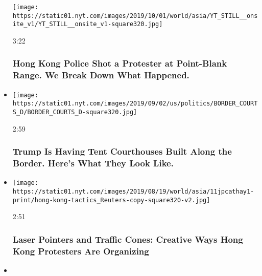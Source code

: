 \begin{itemize}
  \texttt{[image: https://static01.nyt.com/images/2019/10/01/world/asia/YT\_STILL\_\_onsite\_v1/YT\_STILL\_\_onsite\_v1-square320.jpg]}

  3:22

  \hypertarget{hong-kong-police-shot-a-protester-at-point-blank-range-we-break-down-what-happened}{%
  \subsubsection{Hong Kong Police Shot a Protester at Point-Blank Range.
  We Break Down What
  Happened.}\label{hong-kong-police-shot-a-protester-at-point-blank-range-we-break-down-what-happened}}
\item
  \href{https://www.nytimes.com/video/us/politics/100000006681200/border-immigration-tent-courthouses.html?action=click\&module=video-series-bar\&region=header\&pgtype=Article\&playlistId=video/investigations}{}

  \texttt{[image: https://static01.nyt.com/images/2019/09/02/us/politics/BORDER\_COURTS\_D/BORDER\_COURTS\_D-square320.jpg]}

  2:59

  \hypertarget{trump-is-having-tent-courthouses-built-along-the-border-heres-what-they-look-like}{%
  \subsubsection{Trump Is Having Tent Courthouses Built Along the
  Border. Here's What They Look
  Like.}\label{trump-is-having-tent-courthouses-built-along-the-border-heres-what-they-look-like}}
\item
  \href{https://www.nytimes.com/video/world/asia/100000006649109/laser-pointers-and-traffic-cones-creative-ways-hong-kong-protesters-are-organizing.html?action=click\&module=video-series-bar\&region=header\&pgtype=Article\&playlistId=video/investigations}{}

  \texttt{[image: https://static01.nyt.com/images/2019/08/19/world/asia/11jpcathay1-print/hong-kong-tactics\_Reuters-copy-square320-v2.jpg]}

  2:51

  \hypertarget{laser-pointers-and-traffic-cones-creative-ways-hong-kong-protesters-are-organizing}{%
  \subsubsection{Laser Pointers and Traffic Cones: Creative Ways Hong
  Kong Protesters Are
  Organizing}\label{laser-pointers-and-traffic-cones-creative-ways-hong-kong-protesters-are-organizing}}
\item
  \href{https://www.nytimes.com/video/world/asia/100000006624535/hong-kong-protest-police-triad-investigation.html?action=click\&module=video-series-bar\&region=header\&pgtype=Article\&playlistId=video/investigations}{}


\end{itemize}
